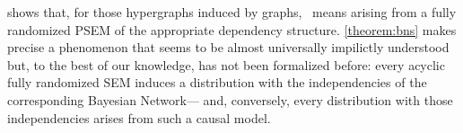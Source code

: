  shows that, for those hypergraphs induced by graphs,
\scibility\ means arising from a fully randomized PSEM of the appropriate dependency structure.
\cref{theorem:bns} 
makes precise a phenomenon that seems to be almost universally impilictly understood
but, to the best of our knowledge, has not been formalized before:
every acyclic fully randomized SEM
induces a distribution with the independencies of the corresponding
Bayesian Network---%
and, conversely,
every distribution with those independencies
arises from such a causal model.


